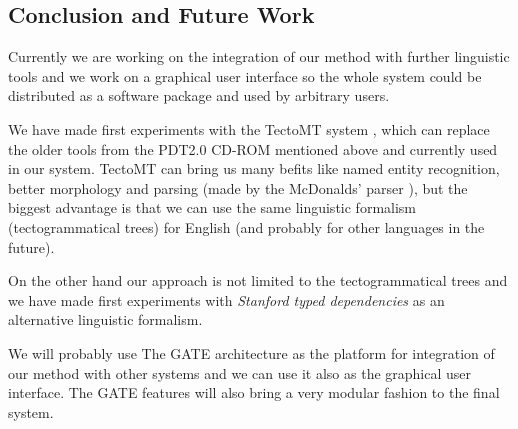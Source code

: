 \begin{multicols}{2}
\section{Conclusion and Future Work}

Currently we are working on the integration of our method with further linguistic tools and we work on a graphical user interface so the whole system could be distributed as a software package and used by arbitrary users.

We have made first experiments with the TectoMT system \cite{dedek:ZaPtTectoMTHighly2008}, which can replace the older tools from the PDT2.0 CD-ROM mentioned above and currently used in our system. TectoMT can bring us many befits like named entity recognition, better morphology and parsing (made by the McDonalds' parser \cite{dedek:mcdonald}), but the biggest advantage is that we can use the same linguistic formalism (tectogrammatical trees) for English (and probably for other languages in the future).

On the other hand our approach is not limited to the tectogrammatical trees and we have made first experiments with \emph{Stanford typed dependencies} \cite{dedek:staford_dependecies} as an alternative linguistic formalism.

We will probably use The GATE architecture \cite{dedek:GATE} as the platform for integration of our method with other systems and we can use it also as the graphical user interface. The GATE features will also bring a very modular fashion to the final system.



%
%






\end{multicols}







